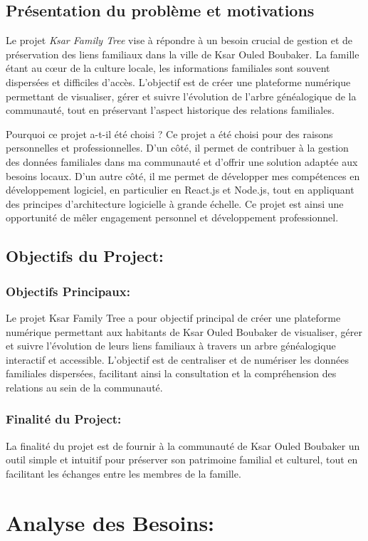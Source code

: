 \documentclass[a4paper,12pt]{report}
\begin{document}
	\section{Présentation du problème et motivations}
	Le projet \textit{Ksar Family Tree} vise à répondre à un besoin crucial de gestion et de préservation des liens familiaux dans la ville de Ksar Ouled Boubaker. La famille étant au cœur de la culture locale, les informations familiales sont souvent dispersées et difficiles d’accès. L’objectif est de créer une plateforme numérique permettant de visualiser, gérer et suivre l’évolution de l’arbre généalogique de la communauté, tout en préservant l’aspect historique des relations familiales.
	
	Pourquoi ce projet a-t-il été choisi ?
	Ce projet a été choisi pour des raisons personnelles et professionnelles. D’un côté, il permet de contribuer à la gestion des données familiales dans ma communauté et d’offrir une solution adaptée aux besoins locaux. D’un autre côté, il me permet de développer mes compétences en développement logiciel, en particulier en React.js et Node.js, tout en appliquant des principes d’architecture logicielle à grande échelle. Ce projet est ainsi une opportunité de mêler engagement personnel et développement professionnel.
	\section{Objectifs du Project:}
	\subsection{Objectifs Principaux:}
	Le projet Ksar Family Tree a pour objectif principal de créer une plateforme numérique permettant aux habitants de Ksar Ouled Boubaker de visualiser, gérer et suivre l’évolution de leurs liens familiaux à travers un arbre généalogique interactif et accessible. L’objectif est de centraliser et de numériser les données familiales dispersées, facilitant ainsi la consultation et la compréhension des relations au sein de la communauté.
	\subsection{Finalité du Project:}
	La finalité du projet est de fournir à la communauté de Ksar Ouled Boubaker un outil simple et intuitif pour préserver son patrimoine familial et culturel, tout en facilitant les échanges entre les membres de la famille.
	
	\chapter{Analyse des Besoins:}
	
\end{document}
